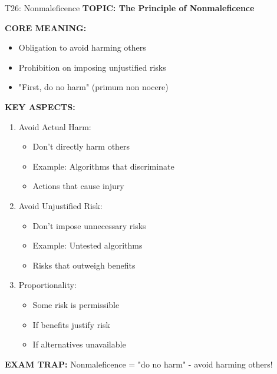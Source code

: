 \documentclass[8pt]{beamer}
\begin{document}
	\begin{frame}{T26: Nonmaleficence}
		\fontsize{6.5}{7.5}\selectfont
		\textbf{TOPIC: The Principle of Nonmaleficence}
		
		\vspace{0.1cm}
		\textbf{CORE MEANING:}
		\begin{itemize}
			\item Obligation to avoid harming others
			\item Prohibition on imposing unjustified risks
			\item "First, do no harm" (primum non nocere)
		\end{itemize}
		
		\vspace{0.1cm}
		\textbf{KEY ASPECTS:}
		\begin{enumerate}
			\item \textcolor{myblue}{Avoid Actual Harm:}
			\begin{itemize}
				\item Don't directly harm others
				\item Example: Algorithms that discriminate
				\item Actions that cause injury
			\end{itemize}
			\item \textcolor{myblue}{Avoid Unjustified Risk:}
			\begin{itemize}
				\item Don't impose unnecessary risks
				\item Example: Untested algorithms
				\item Risks that outweigh benefits
			\end{itemize}
			\item \textcolor{myblue}{Proportionality:}
			\begin{itemize}
				\item Some risk is permissible
				\item If benefits justify risk
				\item If alternatives unavailable
			\end{itemize}
		\end{enumerate}
		
		\textcolor{myred}{\textbf{EXAM TRAP:}} Nonmaleficence = \textcolor{myblue}{"do no harm"} - avoid harming others!
	\end{frame}
	
\end{document}
